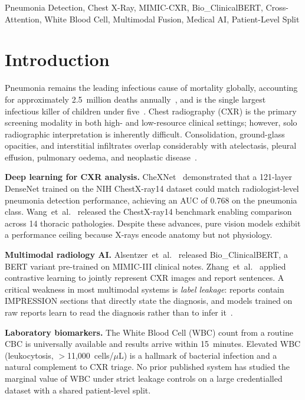 \documentclass[conference]{IEEEtran}
\begin{document}
\begin{IEEEkeywords}
Pneumonia Detection, Chest X-Ray, MIMIC-CXR, Bio\_ClinicalBERT, Cross-Attention, White Blood Cell, Multimodal Fusion, Medical AI, Patient-Level Split
\end{IEEEkeywords}

\section{\textcolor{aideep}{Introduction}}

Pneumonia remains the leading infectious cause of mortality globally, accounting for approximately 2.5~million deaths annually~\cite{gbd2019}, and is the single largest infectious killer of children under five~\cite{who2023}. Chest radiography (CXR) is the primary screening modality in both high- and low-resource clinical settings; however, solo radiographic interpretation is inherently difficult. Consolidation, ground-glass opacities, and interstitial infiltrates overlap considerably with atelectasis, pleural effusion, pulmonary oedema, and neoplastic disease~\cite{kelly2012}.

\textbf{Deep learning for CXR analysis.} CheXNet~\cite{rajpurkar2017chexnet} demonstrated that a 121-layer DenseNet trained on the NIH ChestX-ray14 dataset could match radiologist-level pneumonia detection performance, achieving an AUC of 0.768 on the pneumonia class. Wang~et~al.~\cite{wang2017chestxray14} released the ChestX-ray14 benchmark enabling comparison across 14 thoracic pathologies. Despite these advances, pure vision models exhibit a performance ceiling because X-rays encode anatomy but not physiology.

\textbf{Multimodal radiology AI.} Alsentzer~et~al.~\cite{alsentzer2019bert} released Bio\_ClinicalBERT, a BERT variant pre-trained on MIMIC-III clinical notes. Zhang~et~al.~\cite{zhang2020contrastive} applied contrastive learning to jointly represent CXR images and report sentences. A critical weakness in most multimodal systems is \emph{label leakage}: reports contain IMPRESSION sections that directly state the diagnosis, and models trained on raw reports learn to read the diagnosis rather than to infer it~\cite{bannur2023knowledge}.

\textbf{Laboratory biomarkers.} The White Blood Cell (WBC) count from a routine CBC is universally available and results arrive within 15~minutes. Elevated WBC (leukocytosis, $>$11{,}000~cells/$\mu$L) is a hallmark of bacterial infection and a natural complement to CXR triage. No prior published system has studied the marginal value of WBC under strict leakage controls on a large credentialled dataset with a shared patient-level split.
\end{document}
